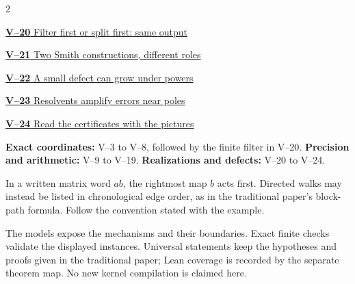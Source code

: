 \documentclass[11pt,a4paper]{article}
\newcommand{\head}[1]{\par\vspace{2pt}{\sffamily\bfseries\normalsize #1}\par\vspace{1pt}}
\begin{document}
\begin{multicols}{2}
{\small\noindent\hyperlink{vpage20}{\textbf{V--20} Filter first or split first: same output}\par\smallskip}
{\small\noindent\hyperlink{vpage21}{\textbf{V--21} Two Smith constructions, different roles}\par\smallskip}
{\small\noindent\hyperlink{vpage22}{\textbf{V--22} A small defect can grow under powers}\par\smallskip}
{\small\noindent\hyperlink{vpage23}{\textbf{V--23} Resolvents amplify errors near poles}\par\smallskip}
{\small\noindent\hyperlink{vpage24}{\textbf{V--24} Read the certificates with the pictures}\par\smallskip}

\end{multicols}
\medskip
\head{Three reading routes}
\textbf{Exact coordinates:} V--3 to V--8, followed by the finite filter in V--20.
\textbf{Precision and arithmetic:} V--9 to V--19.
\textbf{Realizations and defects:} V--20 to V--24.
\head{How to read an ordered product}
In a written matrix word $ab$, the rightmost map $b$ acts first. Directed
walks may instead be listed in chronological edge order, as in the traditional
paper's block-path formula. Follow the convention stated with the example.
\head{What the figures establish}
The models expose the mechanisms and their boundaries. Exact finite checks
validate the displayed instances. Universal statements keep the hypotheses
and proofs given in the traditional paper; Lean coverage is recorded by the
separate theorem map. No new kernel compilation is claimed here.
\clearpage
{}

\end{document}
